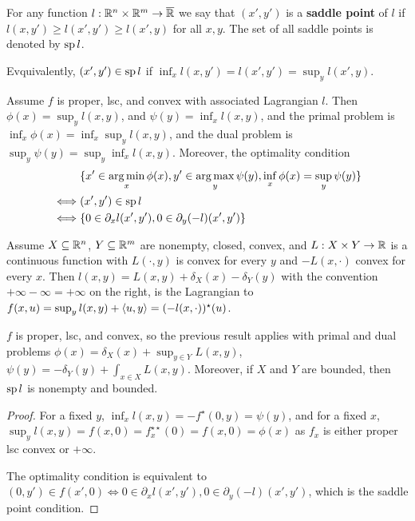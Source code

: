 \begin{defn}
  \label{sec:duality-optimization-9}
  For any function $l: \mathbb{R}^{n} \times \mathbb{R}^{m} \rightarrow \overline {\mathbb{R}}$
  we say that $(x', y')$ is a \textbf{saddle point} of $l$ if $l(x,
  y') \geq l(x', y') \geq l(x', y)$ for all $x, y$. The set of all
  saddle points is denoted by $\operatorname*{sp} l$.

  Evquivalently, $(x', y') \in \operatorname*{sp} l$ if $\inf_{x} l(x, y') = l(x',
  y') = \sup_{y} l(x', y)$.
\end{defn}

\begin{thm}
  \label{sec:duality-optimization-10}
  Assume $f$ is proper, lsc, and convex with associated Lagrangian $l$.
  Then $\phi(x) = \sup_{y} l(x, y)$, and $\psi(y) = \inf_{x} l(x, y)$,
  and the primal problem is $\inf_{x} \phi(x) = \inf_{x} \sup_{y} l(x,
  y)$, and the dual problem is $\sup_{y} \psi(y) = \sup_{y} \inf_{x}
  l(x, y)$.  Moreover, the optimality condition
  \begin{align}
    \label{eq:49}
    &\{ x' \in \operatorname*{arg\,min}_{x} \phi(x), y' \in \operatorname*{arg\,max}_{y} \psi(y),
    \inf_{x} \phi(x) = \sup_{y} \psi(y) \}
    \\ \iff &(x', y') \in \operatorname*{sp} l
    \\ \iff &\{ 0 \in \partial_{x} l(x', y'), 0 \in \partial_{y}(-l)(x', y') \}
  \end{align}
\end{thm}

\begin{thm}
  \label{sec:duality-optimization-11}
  Assume $X \subseteq \mathbb{R}^{n}$, $Y \subseteq \mathbb{R}^{m}$ are nonempty,
  closed, convex, and $L: X \times Y \rightarrow \mathbb{R}$ is a continuous
  function with $L(\cdot, y)$ is convex for every $y$ and $-L(x,
  \cdot)$ convex for every $x$.  Then $l(x, y) = L(x, y) +
  \delta_{X}(x) - \delta_{Y}(y)$ with the convention $+\infty - \infty
  = +\infty$ on the right, is the Lagrangian to $f(x, u) = \sup_{y}
  l(x, y) + \IP{u, y} = (-l(x, \cdot))^{\star}(u)$.

  $f$ is proper, lsc, and convex, so the previous result applies with
  primal and dual problems $\phi(x) = \delta_{X}(x) + \sup_{y \in Y}
  L(x, y)$, $\psi(y) = -\delta_{Y}(y) + \int_{x \in X} L(x, y)$.
  Moreover, if $X$ and $Y$ are bounded, then $\operatorname*{sp} l$ is nonempty and bounded.
\end{thm}

\begin{proof}
  For a fixed $y$, $\inf_{x} l(x, y) = -f^{\star}(0, y) = \psi(y)$,
  and for a fixed $x$, $\sup_{y} l(x, y) = f(x, 0) = f^{\star
    \star}_{x}(0) = f(x, 0) = \phi(x)$ as $f_{x}$ is either proper lsc
  convex or $+\infty$.

  The optimality condition is equivalent to $(0, y') \in f(x', 0) \iff
  0 \in \partial_{x} l(x', y'), 0 \in \partial_{y}(-l)(x', y')$, which
  is the saddle point condition.
\end{proof}


